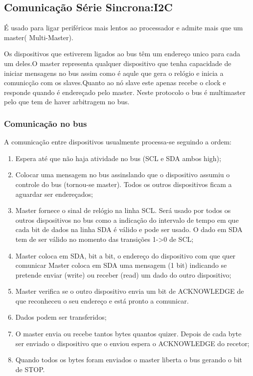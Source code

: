 \documentclass[10pt,a4paper]{paper}
\begin{document}
\newpage

\subsection*{Comunicação Série Sincrona:I2C}

É usado para ligar periféricos mais lentos ao processador e admite mais que um master( Multi-Master).

Os dispositivos que estiverem ligados ao bus têm um endereço unico para cada um deles.O master representa qualquer dispositivo que tenha capacidade de iniciar mensagens no bus assim como é aqule que gera o relógio e inicia a comunicção com os slaves.Quanto ao nó slave este apenas recebe o clock e responde quando é endereçado pelo master. Neste protocolo o bus é multimaster pelo que tem de haver arbitragem no bus.

\subsubsection*{Comunicação no bus}

A comunicação entre dispositivos usualmente processa-se  seguindo a ordem:

\begin{enumerate}
	\item Espera até	que	não	haja	atividade no	bus	(SCL	e	SDA	ambos	high);
	\item Colocar uma mensagem no	bus	assinslando que	o	dispositivo assumiu o	controle do	bus	(tornou-se	master). Todos os outros	dispositivos ficam a	
aguardar ser endereçados;
  \item  Master	fornece o	sinal de	relógio na	linha	SCL.	Será	usado	por	todos	os	outros	 dispositivos	no	bus	como	a	indicação	do	intervalo	de tempo	em	que	cada	bit de	dados	na	linha	SDA	é	válido	e	pode	ser	usado.	O	dado	em	SDA 	tem	de	ser	válido	no	momento	das	transições	1->0	de	SCL;
 \item Master	coloca	em	SDA,	bit	a	bit,	o	endereço	do	dispositivo	com	que	quer comunicar Master	coloca	em	SDA	uma	mensagem	(1	bit)	indicando	se	pretende	enviar	(write)	ou	receber	(read)	um	dado	do	outro	dispositivo;
 \item  Master	verifica	se	o	outro	dispositivo	envia	um	bit	de	ACKNOWLEDGE	de	que	reconheceu	o	seu	endereço	e	está 	pronto	a	comunicar. 	\item Dados	podem	ser	transferidos;
\item O	master	envia	ou	recebe	tantos	bytes	quantos	quizer.	Depois	de	cada	byte	ser	enviado	o	dispositivo	que	o	enviou	espera	o	ACKNOWLEDGE	do	recetor;
\item Quando	todos	os	bytes	foram	enviados	o	master	liberta	o	bus	gerando	o	bit	de	STOP.
\end{enumerate}
\newpage
\end{document}
